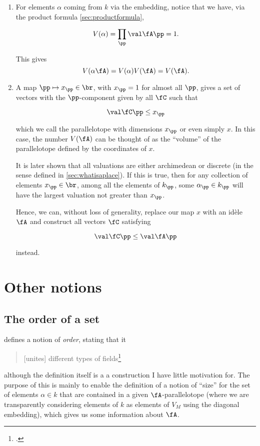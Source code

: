 \begin{enumerate}
\item For elements $\alpha$ coming from $k$ via the embedding, notice that we have, via
  the product formula \ref{sec:productformula},

  \[V(\alpha) = \prod_\pp \val\fA\pp = 1.\]

  This gives \[V(\alpha\fA) = V(\alpha)V(\fA) = V(\fA). \]

\item A map $\pp\mapsto x_\pp \in\br$, with $x_\pp = 1$ for almost all
  $\pp$, gives a set of vectors with the $\pp$-component given by all $\fC$
  such that

  \[\val \fC\pp \leq x_\pp\]

  which we call the parallelotope with dimensions $x_\pp$ or even simply $x$. In this
  case, the number $V(\fA)$ can be thought of as the ``volume'' of the
  parallelotope defined by the coordinates of $x$.

  It is later shown that all valuations are either archimedean or discrete (in
  the sense defined in \ref{sec:whatisaplace}). If this is true, then for any
  collection of elements $x_\pp \in \br$, among all the elements of $k_\pp$,
  some $\alpha_\pp \in k_\pp$ will have the largest valuation not greater than
  $x_\pp$.

  Hence, we can, without loss of generality, replace our map $x$ with
  an id\`ele $\fA$ and construct all vectors $\fC$ satisfying

  \[ \val \fC \pp \leq \val \fA \pp \]

  instead.

\end{enumerate}

\section{Other notions}
\subsection{The order of a set}
\label{sec:order}

\cite{artinwhaples} defines a notion of \textit{order}, stating that it

\begin{quotation}
  [unites] different types of fields\footcite[p. 474]{artinwhaples}
\end{quotation}

although the definition itself is a a construction I have little motivation for.
The purpose of this is mainly to enable the definition of a notion of ``size''
for the set of elements $\alpha \in k$ that are contained in a given
$\fA$-parallelotope (where we are transparently considering elements of $k$ as
elements of $V_M$ using the diagonal embedding), which gives us some information
about $\fA$.


